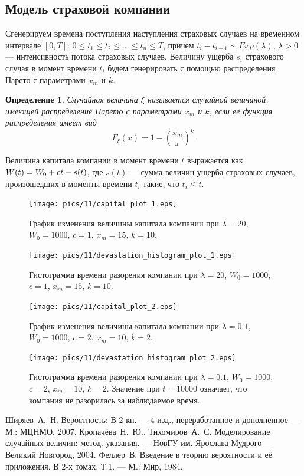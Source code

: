 \documentclass[11pt]{article}
\newtheorem{definition}{Определение}
\newcommand*{\hm}[1]{#1\nobreak\discretionary{}{\hbox{$\mathsurround=0pt #1$}}{}}
\begin{document}
\subsection{Модель страховой компании}
Сгенерируем времена поступления наступления страховых случаев на временном интервале $[0, T]$: $0 \leqslant t_1 \leqslant t_2 \leqslant \ldots \leqslant t_n \leqslant T$, причем $t_i - t_{i-1} \sim Exp(\lambda)$, $\lambda > 0$ --- интенсивность потока страховых случаев. Величину ущерба $s_i$ страхового случая в момент времени $t_i$ будем генерировать с помощью распределения Парето с параметрами $x_m$ и $k$.

\begin{definition}
Случайная величина $\xi$ называется случайной величиной, имеющей распределение Парето с параметрами $x_m$ и $k$, если её функция распределения имеет вид
$$
F_{\xi}(x) = 1 - \left( \frac{x_m}{x} \right)^k.
$$
\end{definition}

Величина капитала компании в момент времени $t$ выражается как $W(t) = W_0 + ct \hm- s(t)$, где $s(t)$ --- сумма величин ущерба страховых случаев, произошедших в моменты времени $t_i$ такие, что $t_i \leqslant t$.
\begin{figure}[h!]
	\centering
	\texttt{[image: pics/11/capital\_plot\_1.eps]}
	\caption{График изменения величины капитала компании при $\lambda = 20$, $W_0 = 1000$, $c = 1$, $x_m = 15$, $k = 10$.}
\end{figure}
\begin{figure}[h!]
	\centering
	\texttt{[image: pics/11/devastation\_histogram\_plot\_1.eps]}
	\caption{Гистограмма времени разорения компании при $\lambda = 20$, $W_0 = 1000$, $c = 1$, $x_m = 15$, $k = 10$.}
\end{figure}
\begin{figure}[h!]
	\centering
	\texttt{[image: pics/11/capital\_plot\_2.eps]}
	\caption{График изменения величины капитала компании при $\lambda = 0.1$, $W_0 = 1000$, $c = 2$, $x_m = 10$, $k = 2$.}
\end{figure}
\begin{figure}[h!]
	\centering
	\texttt{[image: pics/11/devastation\_histogram\_plot\_2.eps]}
	\caption{Гистограмма времени разорения компании при $\lambda = 0.1$, $W_0 = 1000$, $c = 2$, $x_m = 10$, $k = 2$. Значение при $t = 10000$ означает, что компания не разорилась за наблюдаемое время.}
\end{figure}
\pagebreak
{}
\begin{thebibliography}{99}
	 Ширяев~А.~Н. Вероятность: В 2-кн. --- 4 изд., переработанное и дополненное --- М.: МЦНМО, 2007.
	 Кропачёва~Н.~Ю., Тихомиров~А.~С. Моделирование случайных величин: метод. указания. --- НовГУ им. Ярослава Мудрого --- Великий Новгород, 2004.
	 Феллер~В. Введение в теорию вероятности и её приложения. В 2-х томах. Т.1. --- М.: Мир, 1984.
\end{thebibliography}
\end{document}
